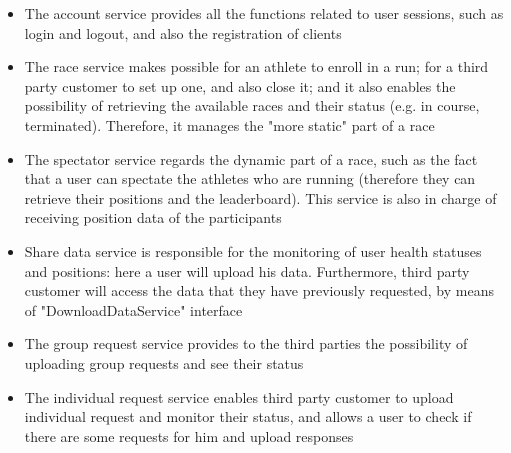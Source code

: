 \begin{itemize}
\item The account service provides all the functions related to user sessions, such as login and logout,
and also the registration of clients 
\item The race service makes possible for an athlete to enroll in a run; for a third party customer to set
up one, and also close it; and it also enables the possibility of retrieving the available races and their
status (e.g. in course, terminated). Therefore, it manages the "more static" part
of a race
\item The spectator service regards the dynamic part of a race, such as the fact that a user can spectate
the athletes who are running (therefore they can retrieve their positions and the leaderboard). This
service is also in charge of receiving position data of the participants
\item Share data service is responsible for the monitoring of user health statuses and positions: here a
user will upload his data. Furthermore, third party customer will access the data that they have
previously requested, by means of "DownloadDataService" interface
\item The group request service provides to the third parties the possibility of uploading group requests and see their status 
\item The individual request service enables third party customer to upload individual request and monitor their status, and allows a user to
check if there are some requests for him and upload responses 
\end{itemize}

